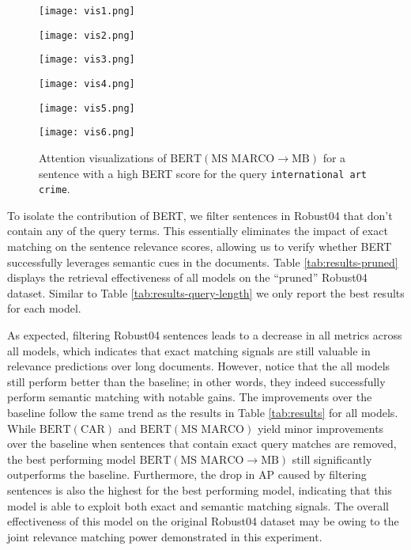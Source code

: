 \begin{figure}
	\centering
    \begin{minipage}{0.3\textwidth}
        \centering
        \texttt{[image: vis1.png]}
    \end{minipage}\hfill
    \begin{minipage}{0.3\textwidth}
        \centering
        \texttt{[image: vis2.png]}
    \end{minipage}\hfill
    \begin{minipage}{0.3\textwidth}
        \centering
        \texttt{[image: vis3.png]}
    \end{minipage}
     \begin{minipage}{0.3\textwidth}
        \centering
        \texttt{[image: vis4.png]}
    \end{minipage}\hfill
    \begin{minipage}{0.3\textwidth}
        \centering
        \texttt{[image: vis5.png]}
    \end{minipage}\hfill
    \begin{minipage}{0.3\textwidth}
        \centering
        \texttt{[image: vis6.png]}
    \end{minipage}
\caption{Attention visualizations of $ \textrm{BERT} (\textrm{MS MARCO}\rightarrow\textrm{MB}) $ for a sentence with a high BERT score for the query \texttt{international art crime}.}
\label{fig:attention}
\end{figure}

To isolate the contribution of BERT, we filter sentences in Robust04 that don't contain any of the query terms.
This essentially eliminates the impact of exact matching on the sentence relevance scores, allowing us to verify whether BERT successfully leverages semantic cues in the documents.
Table \ref{tab:results-pruned} displays the retrieval effectiveness of all models on the ``pruned'' Robust04 dataset.
Similar to Table \ref{tab:results-query-length} we only report the best results for each model.

As expected, filtering Robust04 sentences leads to a decrease in all metrics across all models, which indicates that exact matching signals are still valuable in relevance predictions over long documents.
However, notice that the all models still perform better than the baseline; in other words, they indeed successfully perform semantic matching with notable gains.
The improvements over the baseline follow the same trend as the results in Table \ref{tab:results} for all models.
While $ \textrm{BERT} (\textrm{CAR}) $ and $ \textrm{BERT} (\textrm{MS MARCO}) $ yield minor improvements over the baseline when sentences that contain exact query matches are removed, the best performing model $ \textrm{BERT} (\textrm{MS MARCO}\rightarrow\textrm{MB}) $ still significantly outperforms the baseline.
Furthermore, the drop in AP caused by filtering sentences is also the highest for the best performing model, indicating that this model is able to exploit both exact and semantic matching signals.
The overall effectiveness of this model on the original Robust04 dataset may be owing to the joint relevance matching power demonstrated in this experiment.

